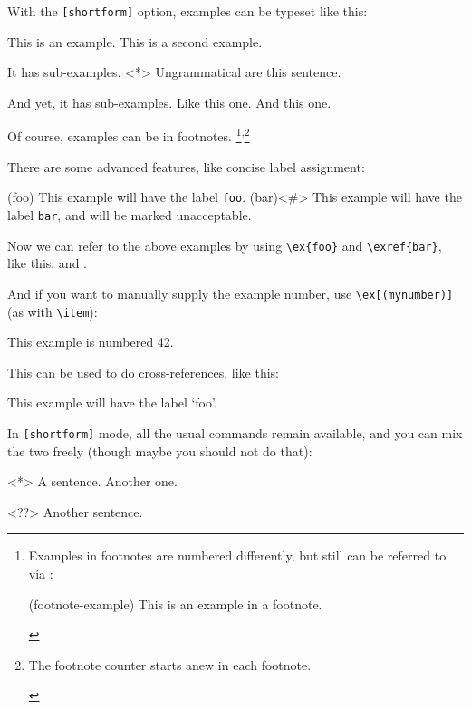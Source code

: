 \documentclass{article}
\begin{document}
%
\noindent With the \verb|[shortform]| option, examples can be typeset like this:
    \begin{exe}
        \ex This is an example.
        \ex This is a second example.
              \begin{exe}
                  \ex It has sub-examples.
                  \ex<*> Ungrammatical are this sentence.
                        \begin{exe}
                            \ex And yet, it has sub-examples. Like this one.
                            \ex And this one.
                        \end{exe}
              \end{exe}
    \end{exe}
Of course, examples can be in footnotes.%
\footnote{%
  Examples in footnotes are numbered differently, but still can be referred
  to via :
  \begin{examples}
      \item(footnote-example) This is an example in a footnote.
  \end{examples}
}\textsuperscript{,}\footnote{%
  \begin{examples}
      \item The footnote counter starts anew in each footnote.
  \end{examples}
}

There are some advanced features, like concise label assignment:%

\begin{exe}
    \ex(foo) This example will have the label \verb|foo|.
    \ex(bar)<\#> This example will have the label \verb|bar|, and will be marked 
                unacceptable.
\end{exe}
%
Now we can refer to the above examples by using \verb|\ex{foo}| and \verb|\exref{bar}|, like this:  and .

And if you want to manually supply the example number, use \verb|\ex[(mynumber)]| (as with \verb|\item|):
\begin{exe}
    \ex[(42)] This example is numbered 42.
\end{exe}
%
This can be used to do cross-references, like this:%
\begin{exe}
     This example will have the label `foo'.
\end{exe}

In \verb|[shortform]| mode, all the usual commands remain available, 
and you can mix the two freely (though maybe you should not do that):
\begin{exe}
  \item<*> A sentence.
  \ex Another one.
\end{exe}
\begin{examples}
  \ex<??> Another sentence.
\end{examples}
\end{document}
